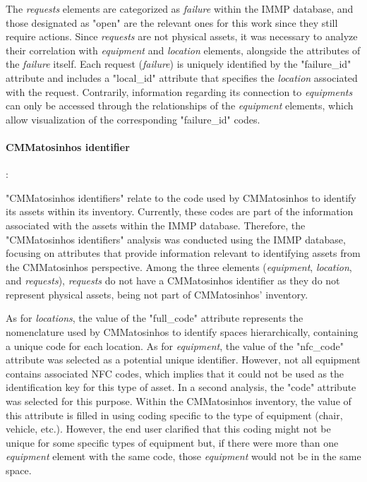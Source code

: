 \documentclass[a4paper, 10pt, twocolumn, twoside]{article}
\begin{document}
The \emph{requests} elements are categorized as \emph{failure} within the IMMP database, and those designated as "open" are the relevant ones for this work since they still require actions. Since \emph{requests} are not physical assets, it was necessary to analyze their correlation with \emph{equipment} and \emph{location} elements, alongside the attributes of the \emph{failure} itself. Each request (\emph{failure}) is uniquely identified by the "failure\_id" attribute and includes a "local\_id" attribute that specifies the \emph{location} associated with the request. Contrarily, information regarding its connection to \emph{equipments} can only be accessed through the relationships of the \emph{equipment} elements, which allow visualization of the corresponding "failure\_id" codes.

\paragraph{CMMatosinhos identifier}:

"CMMatosinhos identifiers" relate to the code used by CMMatosinhos to identify its assets within its inventory. Currently, these codes are part of the information associated with the assets within the IMMP database. Therefore, the "CMMatosinhos identifiers" analysis was conducted using the IMMP database, focusing on attributes that provide information relevant to identifying assets from the CMMatosinhos perspective. Among the three elements (\emph{equipment}, \emph{location}, and \emph{requests}), \emph{requests} do not have a CMMatosinhos identifier as they do not represent physical assets, being not part of CMMatosinhos' inventory. 

As for \emph{locations}, the value of the "full\_code" attribute represents the nomenclature used by CMMatosinhos to identify spaces hierarchically, containing a unique code for each location. As for \emph{equipment}, the value of the "nfc\_code" attribute was selected as a potential unique identifier. However, not all equipment contains associated NFC codes, which implies that it could not be used as the identification key for this type of asset. In a second analysis, the "code" attribute was selected for this purpose. Within the CMMatosinhos inventory, the value of this attribute is filled in using coding specific to the type of equipment (chair, vehicle, etc.). However, the end user clarified that this coding might not be unique for some specific types of equipment but, if there were more than one \emph{equipment} element with the same code, those \emph{equipment} would not be in the same space.
\end{document}
